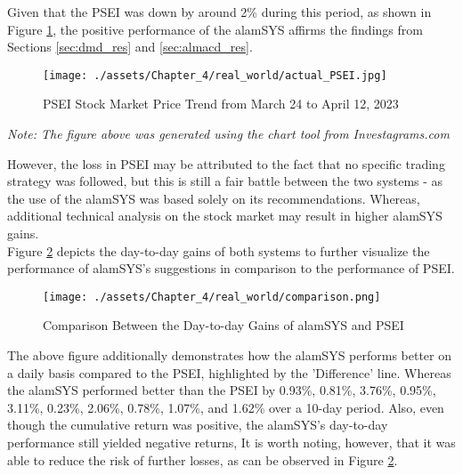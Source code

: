 Given that the PSEI was down by around 2\% during this period, 
as shown in Figure \ref{fig:psei_actual}, the positive performance of 
the alamSYS affirms the findings from Sections \ref{sec:dmd_res} and 
\ref{sec:almacd_res}.
\begin{figure}[ht]
    \centering
    \texttt{[image: ./assets/Chapter\_4/real\_world/actual\_PSEI.jpg]}
    \caption{PSEI Stock Market Price Trend from March 24 to April 12, 2023}
    \label{fig:psei_actual}
\end{figure}
\FloatBarrier
\textit{Note: The figure above was generated using the chart tool from Investagrams.com}

However, the loss in PSEI may be attributed to the fact that no specific trading 
strategy was followed, but this is still a fair battle between the two systems - 
as the use of the alamSYS was based solely on its recommendations. Whereas, additional 
technical analysis on the stock market may result in higher alamSYS gains.
\\

Figure \ref{fig:daytoday} depicts the day-to-day gains of both systems to further visualize 
the performance of alamSYS's suggestions in comparison to the performance of 
PSEI.
\begin{figure}[ht]
    \centering
    \texttt{[image: ./assets/Chapter\_4/real\_world/comparison.png]}
    \caption{Comparison Between the Day-to-day Gains of alamSYS and PSEI}
    \label{fig:daytoday}
\end{figure}
\FloatBarrier

The above figure additionally demonstrates how the alamSYS performs better 
on a daily basis compared to the PSEI, highlighted by the 'Difference' line.  
Whereas the alamSYS performed better than the PSEI by 0.93\%, 0.81\%, 3.76\%, 
0.95\%, 3.11\%, 0.23\%, 2.06\%, 0.78\%, 1.07\%, and 1.62\% over a 10-day 
period. Also, even though the cumulative return was positive, 
the alamSYS's day-to-day performance still yielded negative returns, 
It is worth noting, however, that it was able to reduce the risk of further 
losses, as can be observed in Figure \ref{fig:daytoday}.



